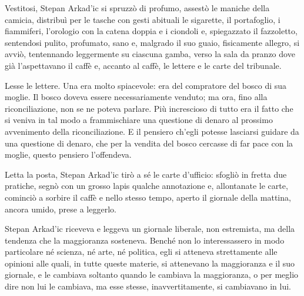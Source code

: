 Vestitosi, Stepan Arkad'ic si spruzzò di profumo, assestò le maniche della camicia, distribuì per le tasche con gesti abituali le sigarette, il portafoglio, i fiammiferi, l'orologio con la catena doppia e i ciondoli e, spiegazzato il fazzoletto, sentendosi pulito, profumato, sano e, malgrado il suo guaio, fisicamente allegro, si avviò, tentennando leggermente su ciascuna gamba, verso la sala da pranzo dove già l'aspettavano il caffè e, accanto al caffè, le lettere e le carte del tribunale. 

Lesse le lettere. Una era molto spiacevole: era del compratore del bosco di sua moglie. Il bosco doveva essere necessariamente venduto; ma ora, fino alla riconciliazione, non se ne poteva parlare. Più increscioso di tutto era il fatto che si veniva in tal modo a frammischiare una questione di denaro al prossimo avvenimento della riconciliazione. E il pensiero ch'egli potesse lasciarsi guidare da una questione di denaro, che per la vendita del bosco cercasse di far pace con la moglie, questo pensiero l'offendeva. 

Letta la posta, Stepan Arkad'ic tirò a sé le carte d'ufficio: sfogliò in fretta due pratiche, segnò con un grosso lapis qualche annotazione e, allontanate le carte, cominciò a sorbire il caffè e nello stesso tempo, aperto il giornale della mattina, ancora umido, prese a leggerlo. 

Stepan Arkad'ic riceveva e leggeva un giornale liberale, non estremista, ma della tendenza che la maggioranza sosteneva. Benché non lo interessassero in modo particolare né scienza, né arte, né politica, egli si atteneva strettamente alle opinioni alle quali, in tutte queste materie, si attenevano la maggioranza e il suo giornale, e le cambiava soltanto quando le cambiava la maggioranza, o per meglio dire non lui le cambiava, ma esse stesse, inavvertitamente, si cambiavano in lui. 

